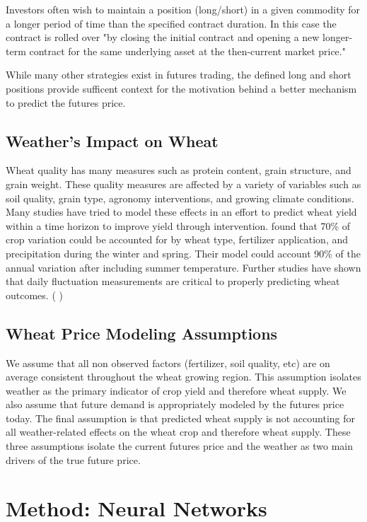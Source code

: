 \documentclass[twoside,11pt]{article}
\begin{document}
  Investors often wish to maintain a position (long/short) in a given commodity for a longer period of time than the specified contract duration. In this case the contract is rolled over "by closing the initial contract and opening a new longer-term contract for the same underlying asset at the then-current market price." \cite{InvestopediaRF}

  While many other strategies exist in futures trading, the defined long and short positions provide sufficent context for the motivation behind a better mechanism to predict the futures price.
 
\subsection{Weather's Impact on Wheat}
	
	Wheat quality has many measures such as protein content, grain structure, and grain weight. These quality measures are affected by a variety of variables such as soil quality, grain type, agronomy interventions, and growing climate conditions. Many studies have tried to model these effects in an effort to predict wheat yield within a time horizon to improve yield through intervention. \cite{Gooding2017} found that 70\% of crop variation could be accounted for by wheat type, fertilizer application, and precipitation during the winter and spring. Their model could account 90\% of the annual variation after including summer temperature. Further studies have shown that daily fluctuation measurements are critical to properly predicting wheat outcomes. (\cite{Nuttall2017} \cite{Mearns1996})
	
\subsection{Wheat Price Modeling Assumptions}
We assume that all non observed factors (fertilizer, soil quality, etc) are on average consistent throughout the wheat growing region. This assumption isolates weather as the primary indicator of crop yield and therefore wheat supply. We also assume that future demand is appropriately modeled by the futures price today. The final assumption is that predicted wheat supply is not accounting for all weather-related effects on the wheat crop and therefore wheat supply. These three assumptions isolate the current futures price and the weather as two main drivers of the true future price. 
	

\section{Method: Neural Networks} \label{model}
\end{document}
